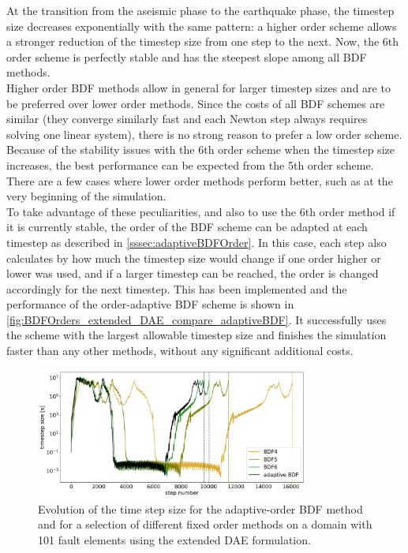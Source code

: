 At the transition from the aseismic phase to the earthquake phase, the timestep size decreases exponentially with the same pattern: a higher order scheme allows a stronger reduction of the timestep size from one step to the next. Now, the 6th order scheme is perfectly stable and has the steepest slope among all BDF methods. \\

Higher order BDF methods allow in general for larger timestep sizes and are to be preferred over lower order methods. Since the costs of all BDF schemes are similar (they converge similarly fast and each Newton step always requires solving one linear system), there is no strong reason to prefer a low order scheme. Because of the stability issues with the 6th order scheme when the timestep size increases, the best performance can be expected from the 5th order scheme. There are a few cases where lower order methods perform better, such as at the very beginning of the simulation. \\

To take advantage of these peculiarities, and also to use the 6th order method if it is currently stable, the order of the BDF scheme can be adapted at each timestep as described in \autoref{sssec:adaptiveBDFOrder}. In this case, each step also calculates by how much the timestep size would change if one order higher or lower was used, and if a larger timestep can be reached, the order is changed accordingly for the next timestep. This has been implemented and the performance of the order-adaptive BDF scheme is shown in \autoref{fig:BDFOrders_extended_DAE_compare_adaptiveBDF}. It successfully uses the scheme with the largest allowable timestep size and finishes the simulation faster than any other methods, without any significant additional costs. 


\begin{figure}[H]
	\centering
	\includegraphics[width=0.8\textwidth]{images/TANDEMTimeAnalysisDifferentBDFOrders_Lagrange_ExtendedDAE_Size101_FULLTIME.png}
	\caption{Evolution of the time step size for the adaptive-order BDF method and for a selection of different fixed order methods on a domain with 101 fault elements using the extended DAE formulation.}
	\label{fig:BDFOrders_extended_DAE_compare_adaptiveBDF}
\end{figure}


